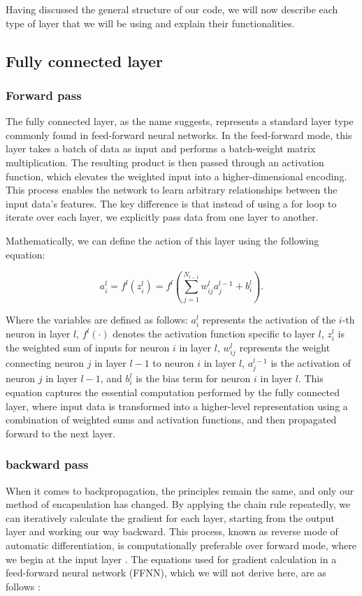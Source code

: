 \documentclass[onecolumn,10pt,cleanfoot]{asme2ej}
\begin{document}
Having discussed the general structure of our code, we will now describe each type of layer that we will be using and explain their functionalities.

\subsection{Fully connected layer}
\subsubsection{Forward pass}
The fully connected layer, as the name suggests, represents a standard layer type commonly found in feed-forward neural networks. In the feed-forward mode, this layer takes a batch of data as input and performs a batch-weight matrix multiplication. The resulting product is then passed through an activation function, which elevates the weighted input into a higher-dimensional encoding. This process enables the network to learn arbitrary relationships between the input data's features. The key difference is that instead of using a for loop to iterate over each layer, we explicitly pass data from one layer to another.

Mathematically, we can define the action of this layer using the following equation:

\begin{equation}
a_i^l = f^l(z_i^l) = f^l\left(\sum_{j=1}^{N_{l-1}} w_{ij}^l a_j^{l-1} + b_i^l\right).
\end{equation}

Where the variables are defined as follows: $a_i^l$ represents the activation of the $i$-th neuron in layer $l$, $f^l(\cdot)$ denotes the activation function specific to layer $l$, $z_i^l$ is the weighted sum of inputs for neuron $i$ in layer $l$, $w_{ij}^l$ represents the weight connecting neuron $j$ in layer $l-1$ to neuron $i$ in layer $l$, $a_j^{l-1}$ is the activation of neuron $j$ in layer $l-1$, and $b_i^l$ is the bias term for neuron $i$ in layer $l$. This equation captures the essential computation performed by the fully connected layer, where input data is transformed into a higher-level representation using a combination of weighted sums and activation functions, and then propagated forward to the next layer.

\subsubsection{backward pass}
When it comes to backpropagation, the principles remain the same, and only our method of encapsulation has changed. By applying the chain rule repeatedly, we can iteratively calculate the gradient for each layer, starting from the output layer and working our way backward. This process, known as reverse mode of automatic differentiation, is computationally preferable over forward mode, where we begin at the input layer \cite[416]{sr}. The equations used for gradient calculation in a feed-forward neural network (FFNN), which we will not derive here, are as follows \cite{morten}:
\end{document}
